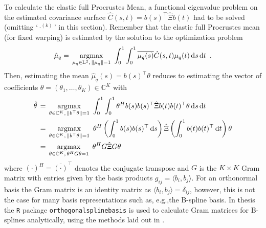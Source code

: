 To calculate the elastic full Procrustes Mean, a functional eigenvalue problem on the estimated covariance surface $\hat{C}(s,t) = b(s)^\top \hat\Xi b(t)$ had to be solved (omitting \enquote*{$\cdot^{(k)}$} in this section).
Remember that the elastic full Procrustes mean (for fixed warping) is estimated by the solution to the optimization problem
\begin{equation}
\hat\mu_q = \, \operatorname*{argmax}_{\mu_q \in \mathbb{L}^2,\,\lVert\mu_q\rVert = 1}\,\,
   \int_0^1 \int_0^1 \overline{\mu_q (s)} \hat C(s,t) \mu_q(t) \mathop{\mathrm{d}s}\mathop{\mathrm{d}t}\,\,.
\end{equation}
Then, estimating the mean $\hat \mu_q (s) = b(s)^\top \theta$ reduces to estimating the vector of coefficients $\theta = (\theta_1, \dots, \theta_K) \in \mathbb{C}^K$ with
\begin{align}
  \hat\theta& \, = \, \operatorname*{argmax}_{\theta \in \mathbb{C}^K,\,\lVert b^\top\theta\rVert = 1}\,\,
    \int_0^1 \int_0^1 \theta^H b(s) b(s)^\top \hat\Xi b(t) b(t)^\top \theta \mathop{\mathrm{d}s}\mathop{\mathrm{d}t} \\
  &\, = \, \operatorname*{argmax}_{\theta \in \mathbb{C}^K,\,\lVert b^\top\theta\rVert = 1}\,\,
    \theta^H \left( \int_0^1 b(s) b(s)^\top \mathop{\mathrm{d}s} \right) \hat\Xi \left( \int_0^1 b(t) b(t)^\top \mathop{\mathrm{d}t}\right) \theta \\
  &\, = \, \operatorname*{argmax}_{\theta \in \mathbb{C}^K,\,\theta^H G \theta = 1}\,\,
    \theta^H G \hat\Xi G \theta \label{eq:3-target}
\end{align}
where $(\cdot)^H = \overline{(\cdot)}^\top$ denotes the conjugate transpose and $G$ is the $K \times K$ Gram matrix with entries given by the basis products $g_{ij} = \langle b_i, b_j \rangle$.
For an orthonormal basis the Gram matrix is an identity matrix as $\langle b_i, b_j \rangle = \delta_{ij}$, however, this is not the case for many basis representations such as, e.g.,the B-spline basis.
In thesis the \texttt{R} package \texttt{orthogonalsplinebasis} \parencite{orthogonalsplinebasis} is used to calculate Gram matrices for B-splines analytically, using the methods laid out in \cite{Redd2012}.

